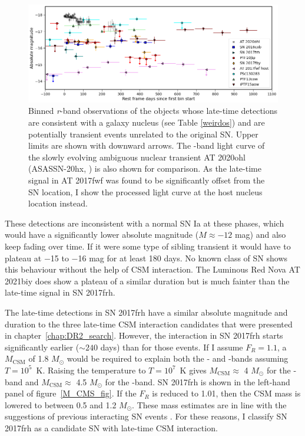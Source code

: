 \documentclass[a4paper,oneside,12pt, class=Latex/Classes/PhDthesisPSnPDF, crop=false]{standalone}
\begin{document}
\begin{figure}
    \centering
    \includegraphics[width=\textwidth]{../Images/chapter_4/ANT_comp.png}
    \caption[Comparision of detected late-time nuclear transients with an ANT.]{Binned \textit{r}-band observations of the objects whose late-time detections are consistent with a galaxy nucleus (see Table \ref{weirdos}) and are potentially transient events unrelated to the original SN. Upper limits are shown with downward arrows. The \ztfr-band light curve of the slowly evolving ambiguous nuclear transient AT 2020ohl (ASASSN-20hx, \citealt{2020ohl_Hinkle}) is also shown for comparison. As the late-time signal in AT 2017fwf was found to be significantly offset from the SN location, I show the processed light curve at the host nucleus location instead.}
    \label{ANT_comp}
\end{figure}

These detections are inconsistent with a normal SN Ia at these phases, which would have a significantly lower absolute magnitude ($M\approx-12$ mag) and also keep fading over time. If it were some type of sibling transient it would have to plateau at $-$15 to $-$16 mag for at least 180 days. No known class of SN shows this behaviour without the help of CSM interaction. The Luminous Red Nova AT 2021biy \citep{2021biy} does show a plateau of a similar duration but is much fainter than the late-time signal in SN 2017frh.

The late-time detections in SN 2017frh have a similar absolute magnitude and duration to the three late-time CSM interaction candidates that were presented in chapter~\ref{chap:DR2_search}. However, the interaction in SN 2017frh starts significantly earlier ($\sim240$ days) than for those events. If I assume $F_R = 1.1$, a $M_\text{CSM}$ of 1.8 $M_\odot$ would be required to explain both the \ztfg- and \ztfr-bands assuming $T=10^5$~K. Raising the temperature to $T=10^7$~K gives $M_\text{CSM}\approx$ 4 $M_\odot$ for the \ztfg-band and $M_\text{CSM}\approx$ 4.5 $M_\odot$ for the \ztfr-band. SN 2017frh is shown in the left-hand panel of figure~\ref{M_CMS_fig}. If the $F_R$ is reduced to 1.01, then the CSM mass is lowered to between 0.5 and 1.2 $M_\odot$. These mass estimates are in line with the suggestions of previous interacting SN events \citep{ptf11kx, Inserra_2016}. For these reasons, I classify SN 2017frh as a candidate SN with late-time CSM interaction.
\end{document}
